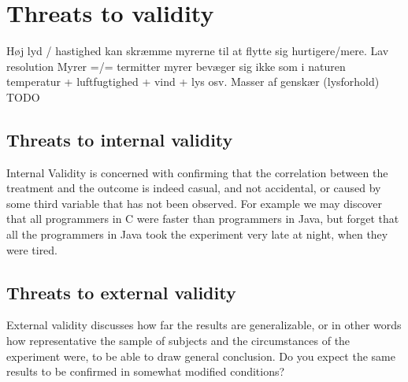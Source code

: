 
\section{Threats to validity}

Høj lyd / hastighed kan skræmme myrerne til at flytte sig hurtigere/mere.
Lav resolution
Myrer =/= termitter
myrer bevæger sig ikke som i naturen
temperatur + luftfugtighed + vind + lys osv.
Masser af genskær (lysforhold)
TODO

\subsection{Threats to internal validity}
Internal Validity is concerned with confirming that the correlation between the treatment and the outcome is indeed casual, and not accidental, or caused by some third variable that has not been observed. For example we may discover that all programmers in C were faster than programmers in Java, but forget that all the programmers in Java took the experiment very late at night, when they were tired.

\subsection{Threats to external validity}
External validity discusses how far the results are generalizable, or in other words how representative the sample of subjects and the circumstances of the experiment were, to be able to draw general conclusion. Do you expect the same results to be confirmed in somewhat modified conditions?
